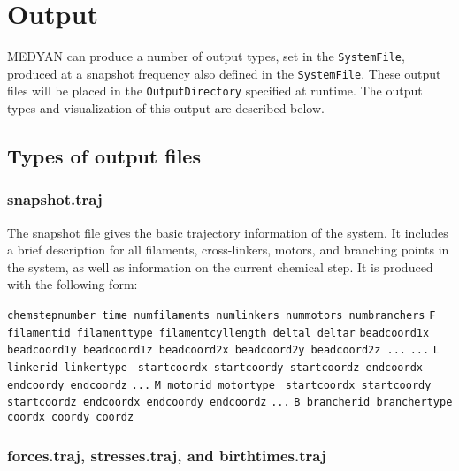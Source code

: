 \documentclass[11pt, oneside]{article}   	%
\begin{document}
\section {Output}

MEDYAN can produce a number of output types, set in the \texttt{SystemFile}, produced at a snapshot frequency also defined in the \texttt{SystemFile}. These output files will be placed in the \texttt{OutputDirectory} specified at runtime. The output types and visualization of this output are described below.

\subsection{Types of output files}
\subsubsection{snapshot.traj}
The snapshot file gives the basic trajectory information of the system. It includes a brief description for all filaments, cross-linkers, motors, and branching points in the system, as well as information on the current chemical step. It is produced with the following form:\newline

\noindent\texttt{chemstepnumber time numfilaments numlinkers nummotors numbranchers}\newline
\texttt{F filamentid filamenttype filamentcyllength deltal deltar}\newline
\texttt{beadcoord1x beadcoord1y beadcoord1z beadcoord2x beadcoord2y beadcoord2z ...}\newline
\texttt{...}\newline
\texttt{L linkerid linkertype }\newline
\texttt{startcoordx startcoordy startcoordz endcoordx endcoordy endcoordz}\newline
\texttt{...}\newline
\texttt{M motorid motortype }\newline
\texttt{startcoordx startcoordy startcoordz endcoordx endcoordy endcoordz}\newline
\texttt{...}\newline
\texttt{B brancherid branchertype }\newline
\texttt{coordx coordy coordz}\newline

\subsubsection{forces.traj, stresses.traj, and birthtimes.traj}
\end{document}
